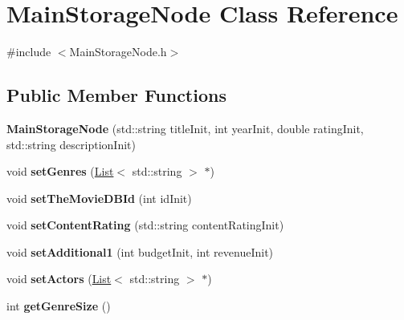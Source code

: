 \hypertarget{class_main_storage_node}{}\section{Main\+Storage\+Node Class Reference}
\label{class_main_storage_node}


{\ttfamily \#include $<$Main\+Storage\+Node.\+h$>$}

\subsection*{Public Member Functions}
\begin{DoxyCompactItemize}
\item 
\mbox{\label{class_main_storage_node_a160ce8514e58014dacbc00ff2e4a8dcc}} 
{\bfseries Main\+Storage\+Node} (std\+::string title\+Init, int year\+Init, double rating\+Init, std\+::string description\+Init)
\item 
\mbox{\label{class_main_storage_node_a7813c7d0a7735acc6c5eea58bc929cb7}} 
void {\bfseries set\+Genres} (\hyperlink{class_list}{List}$<$ std\+::string $>$ $\ast$)
\item 
\mbox{\label{class_main_storage_node_ac07203817a833d1a368291ab873d1d73}} 
void {\bfseries set\+The\+Movie\+D\+B\+Id} (int id\+Init)
\item 
\mbox{\label{class_main_storage_node_a2a0a7620d37ffe368e73819e96cb965f}} 
void {\bfseries set\+Content\+Rating} (std\+::string content\+Rating\+Init)
\item 
\mbox{\label{class_main_storage_node_a4cb54590e40edf5ac46f33c4e381a47d}} 
void {\bfseries set\+Additional1} (int budget\+Init, int revenue\+Init)
\item 
\mbox{\label{class_main_storage_node_a1fac22d35026b8e678e610ca5fb4c8fc}} 
void {\bfseries set\+Actors} (\hyperlink{class_list}{List}$<$ std\+::string $>$ $\ast$)
\item 
\mbox{\label{class_main_storage_node_ab2d02e2d717ab9c4d70764e172709295}} 
int {\bfseries get\+Genre\+Size} ()

\end{DoxyCompactItemize}
